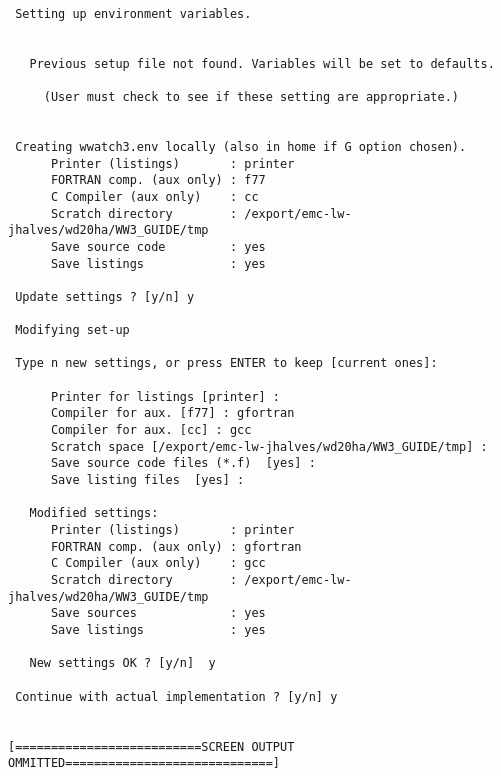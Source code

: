 \begin{minipage}[c]{4.5in}
{\scriptsize \begin{verbatim}

 Setting up environment variables. 


   Previous setup file not found. Variables will be set to defaults. 

     (User must check to see if these setting are appropriate.)      


 Creating wwatch3.env locally (also in home if G option chosen). 
      Printer (listings)       : printer 
      FORTRAN comp. (aux only) : f77 
      C Compiler (aux only)    : cc 
      Scratch directory        : /export/emc-lw-jhalves/wd20ha/WW3_GUIDE/tmp 
      Save source code         : yes 
      Save listings            : yes 

 Update settings ? [y/n] y

 Modifying set-up 

 Type n new settings, or press ENTER to keep [current ones]: 

      Printer for listings [printer] : 
      Compiler for aux. [f77] : gfortran
      Compiler for aux. [cc] : gcc
      Scratch space [/export/emc-lw-jhalves/wd20ha/WW3_GUIDE/tmp] : 
      Save source code files (*.f)  [yes] : 
      Save listing files  [yes] : 
 
   Modified settings:
      Printer (listings)       : printer 
      FORTRAN comp. (aux only) : gfortran 
      C Compiler (aux only)    : gcc 
      Scratch directory        : /export/emc-lw-jhalves/wd20ha/WW3_GUIDE/tmp 
      Save sources             : yes 
      Save listings            : yes 

   New settings OK ? [y/n]  y

 Continue with actual implementation ? [y/n] y


[==========================SCREEN OUTPUT OMMITTED=============================]


\end{verbatim}}
\end{minipage}

